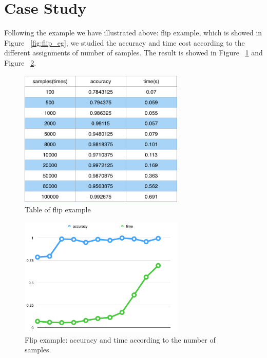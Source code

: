 \section{Case Study}
Following the example we have illustrated above: flip example, which is showed in Figure ~\ref{fig:flip_eg}, we studied the accuracy and time cost according to the different assignments of number of samples. The result is showed in Figure ~\ref{fig:flip_eval1} and Figure  ~\ref{fig:flip_eval2}. 
\begin{figure}
    \centering
    \includegraphics[width=0.7\textwidth]{figures/flip_eval.png}
    \caption{Table of flip example}
    \label{fig:flip_eval1}
\end{figure}

\begin{figure}
    \centering
    \includegraphics[width=0.7\textwidth]{figures/flip_eval2.png}
    \caption{Flip example: accuracy and time according to the number of samples.}
    \label{fig:flip_eval2}
\end{figure}
